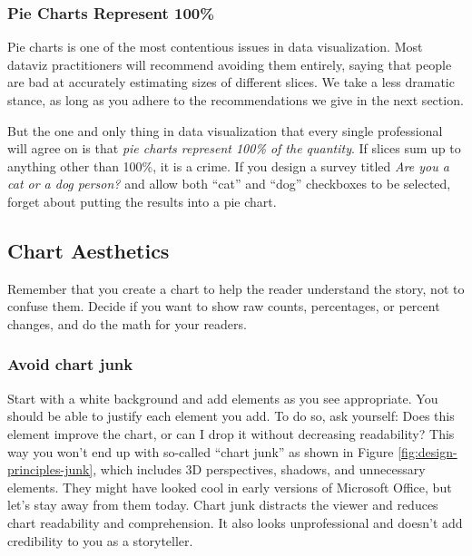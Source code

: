 \documentclass[
  english,
]{book}
\begin{document}
\hypertarget{pie-charts-represent-100}{%
\subsubsection*{Pie Charts Represent 100\%}\label{pie-charts-represent-100}}

Pie charts is one of the most contentious issues in data visualization.
Most dataviz practitioners will recommend avoiding them entirely, saying that
people are bad at accurately estimating sizes of different slices.
We take a less dramatic stance, as long as you adhere to the recommendations
we give in the next section.

But the one and only thing in data visualization that every single professional
will agree on is that \emph{pie charts represent 100\% of the quantity}.
If slices sum up to anything other than 100\%, it is a crime. If you design a survey
titled \emph{Are you a cat or a dog person?} and allow both ``cat'' and ``dog'' checkboxes to be selected,
forget about putting the results into a pie chart.

\hypertarget{chart-aesthetics}{%
\subsection*{Chart Aesthetics}\label{chart-aesthetics}}

Remember that you create a chart to help the reader understand the story, not to confuse them.
Decide if you want to show raw counts, percentages, or percent changes,
and do the math for your readers.

\hypertarget{avoid-chart-junk}{%
\subsubsection*{Avoid chart junk}\label{avoid-chart-junk}}

Start with a white background and add elements as you see appropriate.
You should be able to justify each element you add. To do so, ask yourself:
Does this element improve the chart, or can I drop it without decreasing readability?
This way you won't end up with so-called ``chart junk'' as shown
in Figure \ref{fig:design-principles-junk}, which includes 3D perspectives,
shadows, and unnecessary elements. They might have looked cool in
early versions of Microsoft Office, but let's stay away from them today.
Chart junk distracts the viewer and reduces chart readability and comprehension.
It also looks unprofessional and doesn't add credibility to you as a storyteller.
\end{document}
